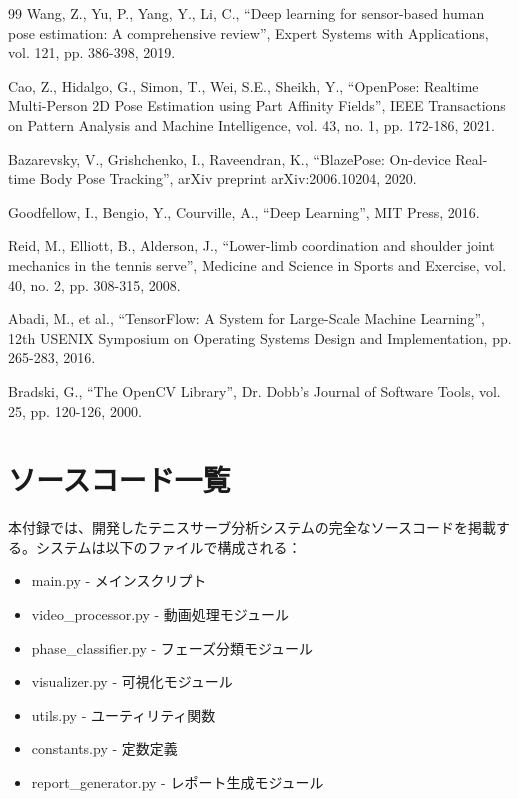 \documentclass[oneside]{suribt}[11pt]
\begin{document}
\begin{thebibliography}{99}
     Wang, Z., Yu, P., Yang, Y., Li, C., ``Deep learning for sensor-based human pose estimation: A comprehensive review'', Expert Systems with Applications, vol. 121, pp. 386-398, 2019.
    
     Cao, Z., Hidalgo, G., Simon, T., Wei, S.E., Sheikh, Y., ``OpenPose: Realtime Multi-Person 2D Pose Estimation using Part Affinity Fields'', IEEE Transactions on Pattern Analysis and Machine Intelligence, vol. 43, no. 1, pp. 172-186, 2021.
    
     Bazarevsky, V., Grishchenko, I., Raveendran, K., ``BlazePose: On-device Real-time Body Pose Tracking'', arXiv preprint arXiv:2006.10204, 2020.
    
     Goodfellow, I., Bengio, Y., Courville, A., ``Deep Learning'', MIT Press, 2016.
    
     Reid, M., Elliott, B., Alderson, J., ``Lower-limb coordination and shoulder joint mechanics in the tennis serve'', Medicine and Science in Sports and Exercise, vol. 40, no. 2, pp. 308-315, 2008.
    
     Abadi, M., et al., ``TensorFlow: A System for Large-Scale Machine Learning'', 12th USENIX Symposium on Operating Systems Design and Implementation, pp. 265-283, 2016.
    
     Bradski, G., ``The OpenCV Library'', Dr. Dobb's Journal of Software Tools, vol. 25, pp. 120-126, 2000.
\end{thebibliography}

\chapter{ソースコード一覧}

本付録では、開発したテニスサーブ分析システムの完全なソースコードを掲載する。システムは以下のファイルで構成される：

\begin{itemize}
\item main.py - メインスクリプト
\item video\_processor.py - 動画処理モジュール
\item phase\_classifier.py - フェーズ分類モジュール
\item visualizer.py - 可視化モジュール
\item utils.py - ユーティリティ関数
\item constants.py - 定数定義
\item report\_generator.py - レポート生成モジュール
\end{itemize}
\end{document}
